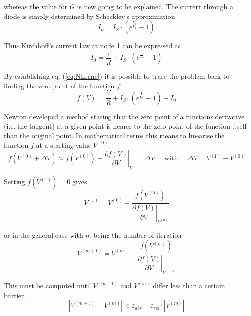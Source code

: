 \documentclass[10pt]{report}
\begin{document}
whereas the value for $G$ is now going to be explained.  The current
through a diode is simply determined by Schockley's approximation
\begin{equation}
I_{d} = I_{S}\cdot \left(e^{\frac{V_{d}}{V_{T}}} - 1\right)
\end{equation}

Thus Kirchhoff's current law at node 1 can be expressed as
\begin{equation}
I_{0} = \dfrac{V}{R} + I_{S}\cdot \left(e^{\frac{V}{V_{T}}} - 1\right)
\end{equation}

By establishing eq. (\ref{eq:NLfunc}) it is possible to trace the
problem back to finding the zero point of the function $f$.
\begin{equation}
f(V) = \dfrac{V}{R} + I_{S}\cdot \left(e^{\frac{V}{V_{T}}} - 1\right) - I_{0}
\label{eq:NLfunc}
\end{equation}

Newton developed a method stating that the zero point of a functions
derivative (i.e. the tangent) at a given point is nearer to the zero
point of the function itself than the original point.  In mathematical
terms this means to linearise the function $f$ at a starting value
$V^{(0)}$.
\begin{equation}
f\left(V^{(0)} + \Delta V\right) \approx f\left(V^{(0)}\right) + \left.\dfrac{\partial f\left(V\right)}{\partial V}\right|_{V^{(0)}}\cdot \Delta V
\;\;\;\; \text{ with } \;\;\;\;
\Delta V = V^{(1)} - V^{(0)}
\label{eq:NRapprox}
\end{equation}

Setting $f(V^{(1)}) = 0$ gives
\begin{equation}
V^{(1)} = V^{(0)} - \dfrac{f\left(V^{(0)}\right)}{\left.\dfrac{\partial f\left(V\right)}{\partial V}\right|_{V^{(0)}}}
\end{equation}

or in the general case with $m$ being the number of iteration
\begin{equation}
V^{(m + 1)} = V^{(m)} - \dfrac{f\left(V^{(m)}\right)}{\left.\dfrac{\partial f\left(V\right)}{\partial V}\right|_{V^{(m)}}}
\label{eq:NRgeneral}
\end{equation}

This must be computed until $V^{(m+1)}$ and $V^{(m)}$ differ less than a
certain barrier.
\begin{equation}
\left|V^{(m+1)} - V^{(m)}\right| < \varepsilon_{abs} + \varepsilon_{rel}\cdot \left|V^{(m)}\right|
\label{eq:NLconvergence}
\end{equation}
\end{document}
